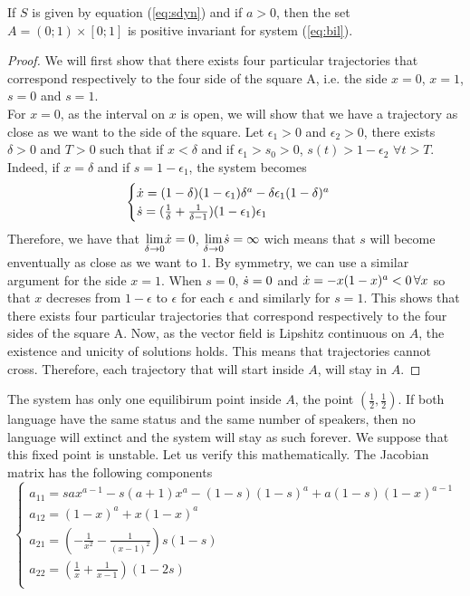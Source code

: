 \documentclass{article}
\begin{document}
\begin{theorem}{}
\label{posinv}
If $S$ is given by equation (\ref{eq:sdyn}) and if $a>0$, then the set $A = (0;1) \times [0;1]$ is positive invariant for system (\ref{eq:bil}).
\end{theorem}

\begin{proof}
We will first show that there exists four particular trajectories that correspond respectively to the four side of the square A, i.e. the side $x=0$, $x=1$, $s=0$ and $s=1$. \\
For $x=0$, as the interval on $x$ is open, we will show that we have a trajectory as close as we want to the side of the square.
Let $\epsilon_1>0$ and $\epsilon_2 >0$, there exists $\delta > 0$ and $T > 0$ such that if $x < \delta$ and  if $\epsilon_1>s_0>0$, $s(t) > 1- \epsilon_2 \, \, \forall t > T$.
Indeed, if $x = \delta$ and  if $s=1-\epsilon_1$, the system becomes
\[
\begin{cases}
\dot{x} =  (1-\delta)(1-\epsilon_1)\delta^a - \delta\epsilon_1(1-\delta)^a  \\
\dot{s} = (\frac{1}{\delta}+\frac{1}{\delta-1})(1-\epsilon_1)\epsilon_1 \\
\end{cases}
\]
Therefore, we have that $\underset{\delta \rightarrow 0}{\text{lim}} \dot{x} = 0$, $\underset{\delta \rightarrow 0}{\text{lim}} \dot{s} = \infty$ wich means that $s$ will become enventually as close as we want to $1$. By symmetry, we can use a similar argument for the side $x=1$.
When $s=0$, $\dot{s} = 0$ and $\dot{x} = -x(1-x)^a < 0 \, \forall{x}$ so that $x$ decreses from $1-\epsilon$ to $\epsilon$ for each $\epsilon$ and similarly for $s=1$.
This shows that there exists four particular trajectories that correspond respectively to the four sides of the square A.
Now, as the vector field is Lipshitz continuous on $A$, the existence and unicity of solutions holds.
This means that trajectories cannot cross.
Therefore, each trajectory that will start inside $A$, will stay in $A$.
\end{proof}

The system has only one equilibirum point inside $A$, the point $(\frac{1}{2}, \frac{1}{2})$.
If both language have the same status and the same number of speakers, then no language will extinct and the system will stay as such forever.
We suppose that this fixed point is unstable.
Let us verify this mathematically.
The Jacobian matrix has the following components
\[
\begin{cases}
a_{11} = sax^{a-1} - s(a+1)x^a - (1-s)(1-s)^a + a(1-s)(1-x)^{a-1} \\
a_{12} = (1-x)^a + x(1-x)^a \\
a_{21} = (-\frac{1}{x^2}-\frac{1}{(x-1)^2})s(1-s) \\
a_{22} = (\frac{1}{x}+\frac{1}{x-1})(1-2s) \\
\end{cases}
\]
\end{document}
